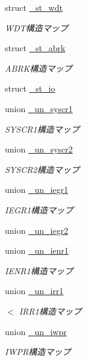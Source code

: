 \begin{DoxyCompactItemize}
struct \hyperlink{3694s_8h_df/dd0/struct__st__wdt}{\+\_\+st\+\_\+wdt}
\begin{DoxyCompactList}\small\item\em W\+D\+T構造マップ \end{DoxyCompactList}\item 
struct \hyperlink{3694s_8h_d2/d0a/struct__st__abrk}{\+\_\+st\+\_\+abrk}
\begin{DoxyCompactList}\small\item\em A\+B\+R\+K構造マップ \end{DoxyCompactList}\item 
struct \hyperlink{3694s_8h_d1/df1/struct__st__io}{\+\_\+st\+\_\+io}
\item 
union \hyperlink{3694s_8h_d0/d8d/union__un__syscr1}{\+\_\+un\+\_\+syscr1}
\begin{DoxyCompactList}\small\item\em S\+Y\+S\+C\+R1構造マップ \end{DoxyCompactList}\item 
union \hyperlink{3694s_8h_d6/d66/union__un__syscr2}{\+\_\+un\+\_\+syscr2}
\begin{DoxyCompactList}\small\item\em S\+Y\+S\+C\+R2構造マップ \end{DoxyCompactList}\item 
union \hyperlink{3694s_8h_dd/d83/union__un__iegr1}{\+\_\+un\+\_\+iegr1}
\begin{DoxyCompactList}\small\item\em I\+E\+G\+R1構造マップ \end{DoxyCompactList}\item 
union \hyperlink{3694s_8h_d7/d75/union__un__iegr2}{\+\_\+un\+\_\+iegr2}
\item 
union \hyperlink{3694s_8h_da/de0/union__un__ienr1}{\+\_\+un\+\_\+ienr1}
\begin{DoxyCompactList}\small\item\em I\+E\+N\+R1構造マップ \end{DoxyCompactList}\item 
union \hyperlink{3694s_8h_d4/d69/union__un__irr1}{\+\_\+un\+\_\+irr1}
\begin{DoxyCompactList}\small\item\em $<$ I\+R\+R1構造マップ \end{DoxyCompactList}\item 
union \hyperlink{3694s_8h_d3/da9/union__un__iwpr}{\+\_\+un\+\_\+iwpr}
\begin{DoxyCompactList}\small\item\em I\+W\+P\+R構造マップ \end{DoxyCompactList}\item 

\end{DoxyCompactItemize}
